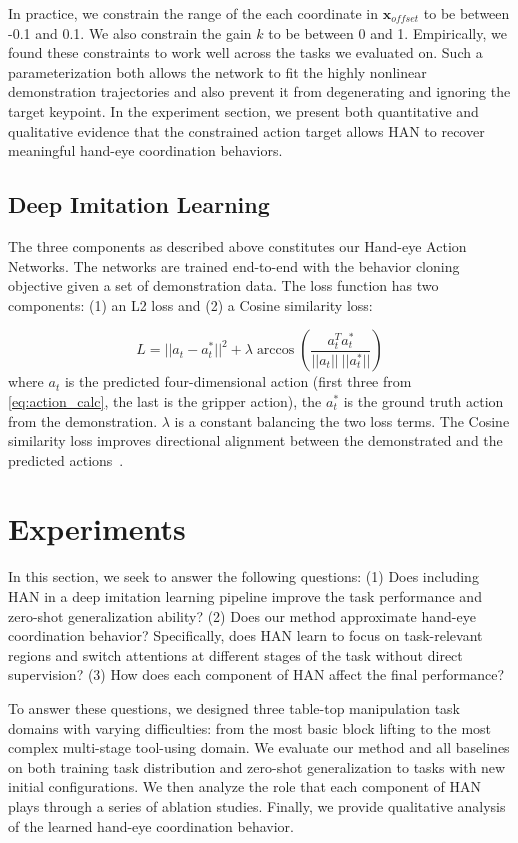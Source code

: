 \documentclass[letterpaper, 10 pt, conference]{ieeeconf}
\newcommand{\algoName}{HAN\xspace}
\newcommand{\algoNameFull}{Hand-eye Action Networks\xspace}
\begin{document}
In practice, we constrain the range of the each coordinate in $\mathbf{x}_{offset}$ to be between -0.1 and 0.1. We also constrain the gain $k$ to be between 0 and 1. Empirically, we found these constraints to work well across the tasks we evaluated on. Such a parameterization both allows the network to fit the highly nonlinear demonstration trajectories and also prevent it from degenerating and ignoring the target keypoint. In the experiment section, we present both quantitative and qualitative evidence that the constrained action target allows \algoName to recover meaningful hand-eye coordination behaviors.

\subsection{Deep Imitation Learning}
The three components as described above constitutes our \algoNameFull. The networks are trained end-to-end with the behavior cloning objective given a set of demonstration data. The loss function has two components: (1) an L2 loss and (2) a Cosine similarity loss:

\begin{equation}
    L = ||a_t - a_t^{*}||^2 + \lambda \arccos(\frac{a_t^Ta^{*}_t}{||a_t||~||a^{*}_t||})
\end{equation}
where $a_t$ is the predicted four-dimensional action (first three from \eqref{eq:action_calc}, the last is the gripper action), the $a_t^{*}$ is the ground truth action from the demonstration. $\lambda$ is a constant balancing the two loss terms. The Cosine similarity loss improves directional alignment between the demonstrated and the predicted actions~\cite{zhang2018deep}.

\section{Experiments}
In this section, we seek to answer the following questions: (1) Does including \algoName in a deep imitation learning pipeline improve the task performance and zero-shot generalization ability? (2) Does our method approximate hand-eye coordination behavior? Specifically, does \algoName learn to focus on task-relevant regions and switch attentions at different stages of the task without direct supervision?
(3) How does each component of \algoName affect the final performance?

To answer these questions, we designed three table-top manipulation task domains with varying difficulties: from the most basic block lifting to the most complex multi-stage tool-using domain. We evaluate our method and all baselines on both training task distribution and zero-shot generalization to tasks with new initial configurations. We then analyze the role that each component of \algoName plays through a series of ablation studies. Finally, we provide qualitative analysis of the learned hand-eye coordination behavior.
\end{document}
